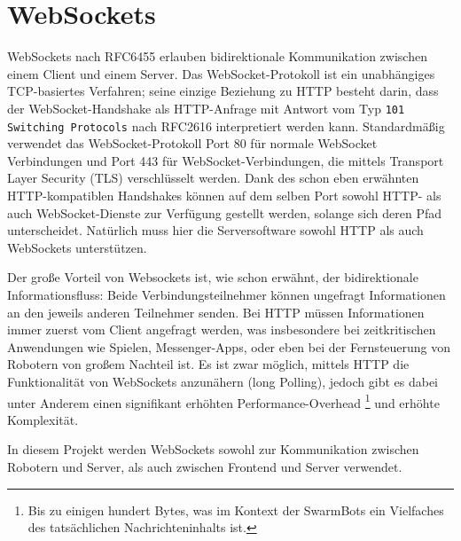 \section{WebSockets}
\label{sec:websockets}
WebSockets nach RFC6455 \cite{rfc6455} erlauben bidirektionale Kommunikation zwischen einem Client und einem Server.
%
Das WebSocket-Protokoll ist ein unabhängiges TCP-basiertes Verfahren;
seine einzige Beziehung zu HTTP besteht darin,
dass der WebSocket-Handshake als HTTP-Anfrage mit Antwort vom Typ
\texttt{101 Switching Protocols} nach RFC2616 \cite{rfc2616} interpretiert werden kann.
%
Standardmäßig verwendet das WebSocket-Protokoll Port 80 für normale WebSocket
Verbindungen und Port 443 für WebSocket-Verbindungen,
die mittels Transport Layer Security (TLS) verschlüsselt werden.
%
Dank des schon eben erwähnten HTTP-kompatiblen Handshakes
können auf dem selben Port sowohl HTTP- als auch WebSocket-Dienste zur Verfügung gestellt werden,
solange sich deren Pfad unterscheidet.
%
Natürlich muss hier die Serversoftware sowohl HTTP als auch WebSockets unterstützen.

Der große Vorteil von Websockets ist,
wie schon erwähnt,
der bidirektionale Informationsfluss:
%
Beide Verbindungsteilnehmer können ungefragt Informationen an den jeweils anderen Teilnehmer senden.
%
Bei HTTP müssen Informationen immer zuerst vom Client angefragt werden,
was insbesondere bei zeitkritischen Anwendungen wie Spielen,
Messenger-Apps,
oder eben bei der Fernsteuerung von Robotern von großem Nachteil ist.
%
Es ist zwar möglich,
mittels HTTP die Funktionalität von WebSockets anzunähern (long Polling),
jedoch gibt es dabei unter Anderem \cite{rfc6202} einen signifikant erhöhten Performance-Overhead%
\footnote{Bis zu einigen hundert Bytes,
  was im Kontext der SwarmBots ein Vielfaches des tatsächlichen Nachrichteninhalts ist.}
und erhöhte Komplexität.

In diesem Projekt werden WebSockets sowohl zur Kommunikation zwischen Robotern und Server,
als auch zwischen Frontend und Server verwendet.

